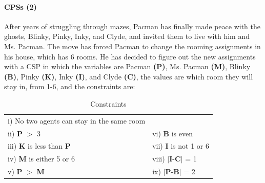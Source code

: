 \newpage

\paragraph{CPSs (2)}

After years of struggling through mazes, Pacman has finally made peace with the ghosts, Blinky, Pinky, Inky, and Clyde, and invited them to live with him and Ms. Pacman. The move has forced Pacman to change the rooming assignments in his house, which has 6 rooms. He has decided to figure out the new assignments with a CSP in which the variables are Pacman \textbf{(P)}, Ms. Pacman \textbf{(M)}, Blinky \textbf{(B)}, Pinky \textbf{(K)}, Inky \textbf{(I)}, and Clyde \textbf{(C)}, the values are which room they will stay in, from 1-6, and the constraints are:\\
\begin{table}[h]
\centering
\caption{Constraints}
\begin{tabular}{ll}
i) No two agents can stay in the same room&\\
ii) \textbf{P} $>$ 3 &
vi) \textbf{B} is even\\
iii) \textbf{K} is less than \textbf{P}&
vii) \textbf{I} is not 1 or 6\\
iv) \textbf{M} is either 5 or 6&
viii) $\vert$\textbf{I}-\textbf{C}$\vert$ = 1\\
v) \textbf{P} $>$ \textbf{M}&
ix) $\vert$\textbf{P}-\textbf{B}$\vert$ = 2
\end{tabular}
\end{table}


